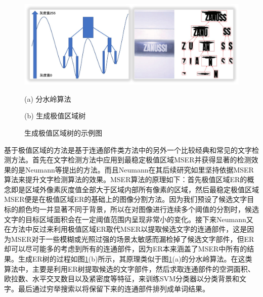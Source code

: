     \begin{figure}[!h]
    \centering
    \includegraphics[width=\textwidth]{./figures/c2_er_tree.jpg}
    \begin{minipage}[t]{0.48\linewidth}
    \centerline{ \small (a) 分水岭算法}
    \end{minipage}
    \begin{minipage}[t]{0.48\linewidth}
    \centerline{ \small (b) 生成极值区域树}
    \end{minipage}
    \caption{生成极值区域树的示例图}
    \label{fig.c2_er_tree}
    \end{figure}
    
    基于极值区域的方法是基于连通部件类方法中的另外一个比较经典和常见的文字检测方法。首先在文字检测方法中应用到最稳定极值区域MSER并获得显著的检测效果的是Neumann等\cite{Neumann2010A}提出的方法。而且Neumann在其后续研究如\cite{Neumann2011Text}里坚持依据MSER算法来提升文字检测算法的效果。MSER算法的原理如下：首先极值区域ER的概念即是区域外像素灰度值全部大于区域内部所有像素的区域，然后最稳定极值区域MSER便是在极值区域ER的基础上的图像分割方法。因为我们预设了候选文字目标的颜色均一并显著不同于背景，所以在对图像进行连续多个阈值的分割时，候选文字的目标区域面积会在一定阈值范围内呈现非常小的变化。接下来Neumann又在方法\cite{Neumann2012Real}中反过来利用极值区域ER取代MSER以提取候选文字的连通部件，这是因为MSER对于一些模糊或光照过强的场景太敏感而漏检掉了候选文字部件，但ER却可以尽可能多的考虑到所有的连通部件，因为ER本来涵盖了MSER中所有的结果。生成ER树的过程如图\ref{fig.c2_er_tree}(b)所示，其原理类似于图\ref{fig.c2_er_tree}(a)的分水岭算法。在这类算法中，主要是利用ER树提取候选的文字部件，然后求取连通部件的空洞面积、欧拉数、水平交叉数目以及紧密度等特征，来训练SVM分类器以分类背景和文字。最后通过穷举搜索以将保留下来的连通部件排列成单词结果。

